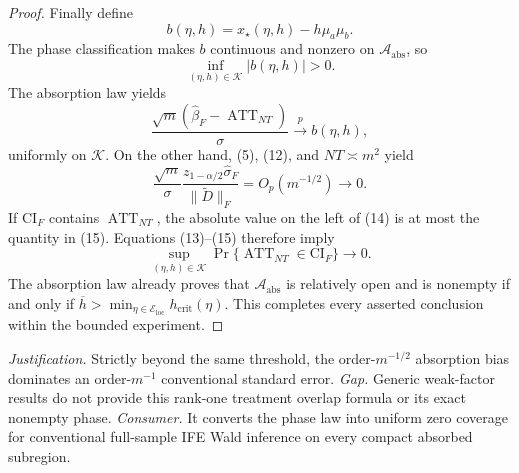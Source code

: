 \documentclass{article}
\begin{document}
\begin{proof}
Finally define
\[
 b(\eta,h)=x_\star(\eta,h)-h\mu_a\mu_b.
\]
The phase classification makes \(b\) continuous and nonzero on \(\mathcal A_{\mathrm{abs}}\), so
\[
 \inf_{(\eta,h)\in\mathcal K}|b(\eta,h)|>0. \tag{13}
\]
The absorption law yields
\[
 \frac{\sqrt m(\widehat\beta_F-\operatorname{ATT}_{NT})}{\sigma}
 \xrightarrow{p}b(\eta,h), \tag{14}
\]
uniformly on \(\mathcal K\).  On the other hand, (5), (12), and \(NT\asymp m^2\) yield
\[
 \frac{\sqrt m}{\sigma}
 \frac{z_{1-\alpha/2}\widehat\sigma_F}{\|\widetilde D\|_F}
 =O_p(m^{-1/2})\longrightarrow0. \tag{15}
\]
If \(\mathrm{CI}_F\) contains \(\operatorname{ATT}_{NT}\), the absolute value on the left of (14) is at most the quantity in (15).  Equations (13)--(15) therefore imply
\[
 \sup_{(\eta,h)\in\mathcal K}
 \Pr\{\operatorname{ATT}_{NT}\in\mathrm{CI}_F\}\longrightarrow0. \tag{16}
\]
The absorption law already proves that \(\mathcal A_{\mathrm{abs}}\) is relatively open and is nonempty if and only if
\(\overline h>\min_{\eta\in\mathcal E_{\mathrm{loc}}}h_{\mathrm{crit}}(\eta)\).  This completes every asserted conclusion within the bounded experiment.
\end{proof}
\par\smallskip\noindent \textit{Justification.} Strictly beyond the same threshold, the order-\(m^{-1/2}\) absorption bias dominates an order-\(m^{-1}\) conventional standard error. \textit{Gap.} Generic weak-factor results do not provide this rank-one treatment overlap formula or its exact nonempty phase. \textit{Consumer.} It converts the phase law into uniform zero coverage for conventional full-sample IFE Wald inference on every compact absorbed subregion.
\end{document}
